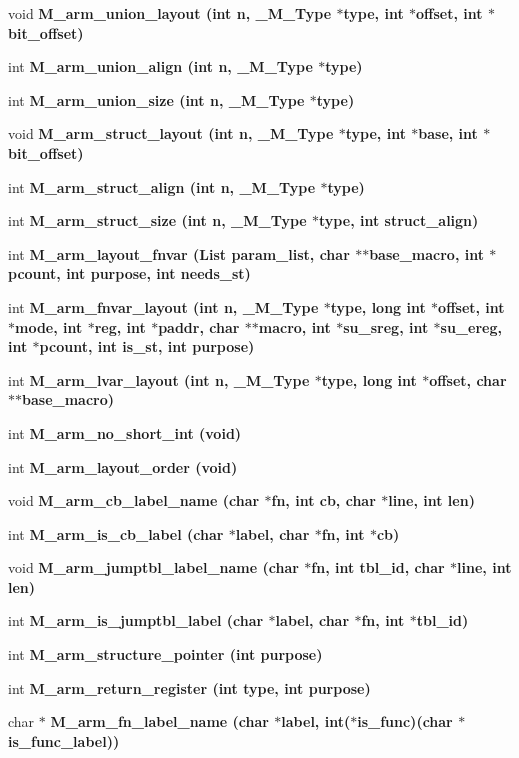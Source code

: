 \begin{CompactItemize}
void \bf{M\_\-arm\_\-union\_\-layout} (int n, \bf{\_\-M\_\-Type} $\ast$type, int $\ast$offset, int $\ast$bit\_\-offset)
\item 
int \bf{M\_\-arm\_\-union\_\-align} (int n, \bf{\_\-M\_\-Type} $\ast$type)
\item 
int \bf{M\_\-arm\_\-union\_\-size} (int n, \bf{\_\-M\_\-Type} $\ast$type)
\item 
void \bf{M\_\-arm\_\-struct\_\-layout} (int n, \bf{\_\-M\_\-Type} $\ast$type, int $\ast$base, int $\ast$bit\_\-offset)
\item 
int \bf{M\_\-arm\_\-struct\_\-align} (int n, \bf{\_\-M\_\-Type} $\ast$type)
\item 
int \bf{M\_\-arm\_\-struct\_\-size} (int n, \bf{\_\-M\_\-Type} $\ast$type, int struct\_\-align)
\item 
int \bf{M\_\-arm\_\-layout\_\-fnvar} (\bf{List} param\_\-list, char $\ast$$\ast$base\_\-macro, int $\ast$pcount, int purpose, int needs\_\-st)
\item 
int \bf{M\_\-arm\_\-fnvar\_\-layout} (int n, \bf{\_\-M\_\-Type} $\ast$type, long int $\ast$offset, int $\ast$\bf{mode}, int $\ast$reg, int $\ast$paddr, char $\ast$$\ast$macro, int $\ast$su\_\-sreg, int $\ast$su\_\-ereg, int $\ast$pcount, int is\_\-st, int purpose)
\item 
int \bf{M\_\-arm\_\-lvar\_\-layout} (int n, \bf{\_\-M\_\-Type} $\ast$type, long int $\ast$offset, char $\ast$$\ast$base\_\-macro)
\item 
int \bf{M\_\-arm\_\-no\_\-short\_\-int} (void)
\item 
int \bf{M\_\-arm\_\-layout\_\-order} (void)
\item 
void \bf{M\_\-arm\_\-cb\_\-label\_\-name} (char $\ast$fn, int cb, char $\ast$line, int len)
\item 
int \bf{M\_\-arm\_\-is\_\-cb\_\-label} (char $\ast$label, char $\ast$fn, int $\ast$cb)
\item 
void \bf{M\_\-arm\_\-jumptbl\_\-label\_\-name} (char $\ast$fn, int tbl\_\-id, char $\ast$line, int len)
\item 
int \bf{M\_\-arm\_\-is\_\-jumptbl\_\-label} (char $\ast$label, char $\ast$fn, int $\ast$tbl\_\-id)
\item 
int \bf{M\_\-arm\_\-structure\_\-pointer} (int purpose)
\item 
int \bf{M\_\-arm\_\-return\_\-register} (int type, int purpose)
\item 
char $\ast$ \bf{M\_\-arm\_\-fn\_\-label\_\-name} (char $\ast$label, int($\ast$is\_\-func)(char $\ast$is\_\-func\_\-label))
$$
\end{CompactItemize}
